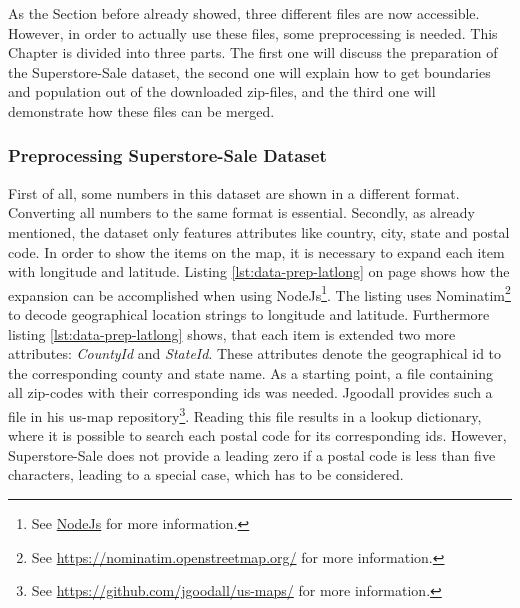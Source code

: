 As the Section before already showed, three different files are now accessible. However, in order to actually use these files, some preprocessing is needed. This Chapter is divided into three parts. The first one will discuss the preparation of the Superstore-Sale dataset, the second one will explain how to get boundaries and population out of the downloaded zip-files, and the third one will demonstrate how these files can be merged.

\subsubsection{Preprocessing Superstore-Sale Dataset}
First of all, some numbers in this dataset are shown in a different format. Converting all numbers to the same format is essential.
Secondly, as already mentioned, the dataset only features attributes like country, city, state and postal code. In order to show the items on the map, it is necessary to expand each item with longitude and latitude. Listing \ref{lst:data-prep-latlong} on page \pageref{lst:data-prep-latlong} shows how the expansion can be accomplished when using NodeJs\footnote{See \href{https://nodejs.org/en/}{NodeJs} for more information.}. The listing uses Nominatim\footnote{See \href{https://nominatim.openstreetmap.org/}{https://nominatim.openstreetmap.org/} for more information.} to decode geographical location strings to longitude and latitude. Furthermore listing \ref{lst:data-prep-latlong} shows, that each item is extended two more attributes: \textit{CountyId} and \textit{StateId}. These attributes denote the geographical id to the corresponding county and state name. As a starting point, a file containing all zip-codes with their corresponding ids was needed. Jgoodall provides such a file in his us-map repository\footnote{See \href{https://github.com/jgoodall/us-maps/}{https://github.com/jgoodall/us-maps/} for more information.}. Reading this file results in a lookup dictionary, where it is possible to search each postal code for its corresponding ids. However, Superstore-Sale does not provide a leading zero if a postal code is less than five characters, leading to a special case, which has to be considered.

